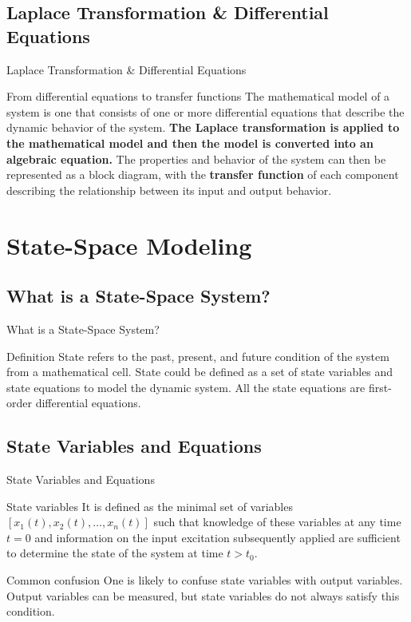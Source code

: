\documentclass[aspectratio=169,xcolor=dvipsnames]{beamer}
\begin{document}
\subsection{Laplace Transformation \& Differential Equations}
\begin{frame}{Laplace Transformation \& Differential Equations}
    \begin{block}{From differential equations to transfer functions}
        The mathematical model of a system is one that consists of one or more differential equations that describe the dynamic behavior of the system. \textbf{The Laplace transformation is applied to the mathematical model and then the model is converted into an algebraic equation.} The properties and behavior of the system can then be represented as a block diagram, with the \textbf{transfer function} of each component describing the relationship between its input and output behavior.
    \end{block}
\end{frame}

\section{State-Space Modeling}

\subsection{What is a State-Space System?}
\begin{frame}{What is a State-Space System?}
    \begin{block}{Definition}
        State refers to the past, present, and future condition of the system from a mathematical cell. State could be defined as a set of state variables and state equations to model the dynamic system. All the state equations are first-order differential equations.
    \end{block}
\end{frame}

\subsection{State Variables and Equations}
\begin{frame}{State Variables and Equations}
    \begin{block}{State variables}
        It is defined as the minimal set of variables $[x_1(t), x_2(t), \dots, x_n(t)]$ such that knowledge of these variables at any time $t = 0$ and information on the input excitation subsequently applied are sufficient to determine the state of the system at time $t > t_0$.
    \end{block}
    \begin{alertblock}{Common confusion}
        One is likely to confuse state variables with output variables. Output variables can be measured, but state variables do not always satisfy this condition.
    \end{alertblock}
\end{frame}
\end{document}
